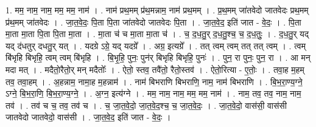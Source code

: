 \documentclass[17pt]{extarticle}
\begin{document}
1. मम॒ नाम॒ नाम॒ मम॒ मम॒ नाम॑ । . नाम॑ प्रथ॒मम् प्र॑थ॒मन्नाम॒ नाम॑ प्रथ॒मम् । . प्र॒थ॒मम् जा॑तवेदो जातवेदः प्रथ॒मम् प्र॑थ॒मम् जा॑तवेदः । . जा॒त॒वे॒दः॒ पि॒ता पि॒ता जा॑तवेदो जातवेदः पि॒ता । . जा॒त॒वे॒द॒ इति॑ जात - वे॒दः॒ । . पि॒ता मा॒ता मा॒ता पि॒ता पि॒ता मा॒ता । . मा॒ता च॑ च मा॒ता मा॒ता च॑ । . च॒ द॒ध॒तु॒र् द॒ध॒तु॒श्च॒ च॒ द॒ध॒तुः॒ । . द॒ध॒तु॒र् यद् यद् द॑धतुर् दधतु॒र् यत् । . यदग्रे ऽग्रे॒ यद् यदग्रे᳚ । . अग्र॒ इत्यग्रे᳚ । . तत् त्वम् त्वम् तत् तत् त्वम् । . त्वम् बि॑भृहि बिभृहि॒ त्वम् त्वम् बि॑भृहि । . बि॒भृ॒हि॒ पुनः॒ पुन॑र् बिभृहि बिभृहि॒ पुनः॑ । . पुन॒ रा पुनः॒ पुन॒ रा । . आ मन् मदा मत् । . मदैतो॒रैतो॒र् मन् मदैतोः᳚ । . ऐतो॒ स्तव॒ तवै॑तो॒ रैतो॒स्तव॑ । . ऐतो॒रित्या - ए॒तोः॒ । . तवा॒ह म॒हम् तव॒ तवा॒हम् । . अ॒हन्नाम॒ नामा॒ह म॒हन्नाम॑ । . नाम॑ बिभराणि बिभराणि॒ नाम॒ नाम॑ बिभराणि । . बि॒भ॒रा॒ण्य॒ग्ने॒ ऽग्ने॒ बि॒भ॒रा॒णि॒ बि॒भ॒रा॒ण्य॒ग्ने॒ । . अ॒ग्न॒ इत्य॑ग्ने । . मम॒ नाम॒ नाम॒ मम॒ मम॒ नाम॑ । . नाम॒ तव॒ तव॒ नाम॒ नाम॒ तव॑ । . तव॑ च च॒ तव॒ तव॑ च । . च॒ जा॒त॒वे॒दो॒ जा॒त॒वे॒द॒श्च॒ च॒ जा॒त॒वे॒दः॒ । . जा॒त॒वे॒दो॒ वास॑सी॒ वास॑सी जातवेदो जातवेदो॒ वास॑सी । . जा॒त॒वे॒द॒ इति॑ जात - वे॒दः॒ । \newline
\end{document}
